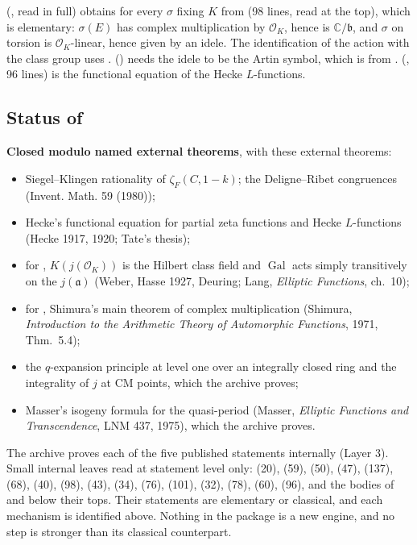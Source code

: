 \documentclass[11pt]{article}
\newcommand{\sE}{\textbf{Closed modulo named external theorems}}
\theoremstyle{remark}
\begin{document}
 (, read in full) obtains  for every $\sigma$ fixing $K$ from  (98 lines, read at the top), which is elementary: $\sigma(E)$ has complex multiplication by $\mathcal O_K$, hence is $\mathbb C/\mathfrak b$, and $\sigma$ on torsion is $\mathcal O_K$-linear, hence given by an idele. The identification of the action with the class group uses .  () needs the idele to be the Artin symbol, which is  from .  (, 96 lines) is the functional equation of the Hecke $L$-functions.

\subsection{Status of }

\noindent\textbf{\sE}, with these external theorems:
\begin{itemize}[nosep]
\item Siegel--Klingen rationality of $\zeta_F(C,1-k)$; the Deligne--Ribet congruences (Invent. Math. 59 (1980));
\item Hecke's functional equation for partial zeta functions and Hecke $L$-functions (Hecke 1917, 1920; Tate's thesis);
\item for , $K(j(\mathcal O_K))$ is the Hilbert class field and $\operatorname{Gal}$ acts simply transitively on the $j(\mathfrak a)$ (Weber, Hasse 1927, Deuring; Lang, \emph{Elliptic Functions}, ch.~10);
\item for , Shimura's main theorem of complex multiplication (Shimura, \emph{Introduction to the Arithmetic Theory of Automorphic Functions}, 1971, Thm.~5.4);
\item the $q$-expansion principle at level one over an integrally closed ring and the integrality of $j$ at CM points, which the archive proves;
\item Masser's isogeny formula for the quasi-period (Masser, \emph{Elliptic Functions and Transcendence}, LNM 437, 1975), which the archive proves.
\end{itemize}
The archive proves each of the five published statements internally (Layer 3). Small internal leaves read at statement level only:  (20),  (59),  (50),  (47),  (137),  (68),  (40),  (98),  (43),  (34),  (76),  (101),  (32),  (78),  (60),  (96), and the bodies of  and  below their tops. Their statements are elementary or classical, and each mechanism is identified above. Nothing in the package is a new engine, and no step is stronger than its classical counterpart.
\end{document}
